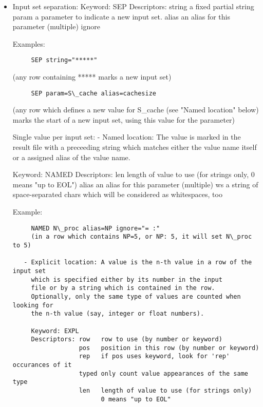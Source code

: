\documentclass[12pt,a4paper]{article}
\begin{document}
   \begin{itemize}
   \item Input set separation:
     Keyword: SEP
     Descriptors: string        a fixed partial string 
                  param         a parameter to indicate a new input set.
                  alias         an alias for this parameter (multiple)
                  ignore        

     Examples:
\begin{verbatim}
     SEP string="*****"
\end{verbatim}
     (any row containing ***** marks a new input set)     
\begin{verbatim}
     SEP param=S\_cache alias=cachesize
\end{verbatim}
     (any row which defines a new value for S\_cache (see "Named location" below)
      marks the start of a new input set, using this value for the  parameter)

   Single value per input set:
   - Named location: The value is marked in the result file with a 
     preceeding string which matches either the value name itself or
     a assigned alias of the value name.

     Keyword: NAMED
     Descriptors: len     length of value to use 
                          (for strings only, 0 means "up to EOL")
                  alias   an alias for this parameter (multiple)
                  ws      a string of space-separated chars which will
                          be considered as whitespaces, too

     Example:
\begin{verbatim}
     NAMED N\_proc alias=NP ignore="= :"
     (in a row which contains NP=5, or NP: 5, it will set N\_proc to 5)

   - Explicit location: A value is the n-th value in a row of the input set 
     which is specified either by its number in the input
     file or by a string which is contained in the row.
     Optionally, only the same type of values are counted when looking for
     the n-th value (say, integer or float numbers).
     
     Keyword: EXPL
     Descriptors: row   row to use (by number or keyword)
                  pos   position in this row (by number or keyword)
                  rep   if pos uses keyword, look for 'rep' occurances of it
                  typed only count value appearances of the same type
                  len   length of value to use (for strings only)
                        0 means "up to EOL"


\end{verbatim}
\end{itemize}
\end{document}
